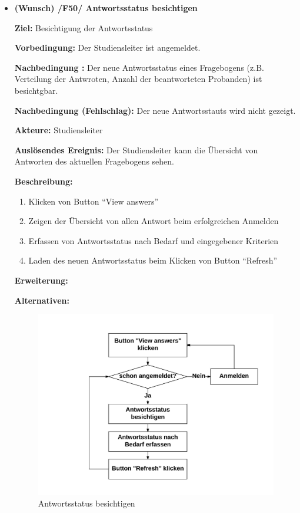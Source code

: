 \documentclass[a4paper]{scrreprt}
\begin{document}
\begin{itemize}
                \item \textbf{(Wunsch) /F50/ \gls{Antwortsstatus} besichtigen}
                \par \textbf{Ziel: }Besichtigung der Antwortsstatus
                \par \textbf{Vorbedingung: }Der \gls{Studiensleiter} ist angemeldet.
                \par \textbf{Nachbedingung : }Der neue Antwortsstatus eines Fragebogens (z.B. Verteilung der Antwroten, Anzahl der beantworteten \gls{Proband}en) ist besichtgbar.
                \par \textbf{Nachbedingung (Fehlschlag): }Der neue Antwortsstauts wird nicht gezeigt.
                \par \textbf{Akteure: }\gls{Studiensleiter}
                \par \textbf{Auslösendes Ereignis: }Der \gls{Studiensleiter} kann die \"Ubersicht von Antworten des aktuellen Fragebogens sehen.
                \par \textbf{Beschreibung: }
                \begin{enumerate}
                    \item Klicken von Button ``View answers''
                    \item Zeigen der \"Ubersicht von allen Antwort beim erfolgreichen Anmelden
                    \item Erfassen von Antwortsstatus nach Bedarf und eingegebener Kriterien
                    \item Laden des neuen Antwortsstatus beim Klicken von Button ``Refresh''
                \end{enumerate}
                \par \textbf{Erweiterung: }
                \par \textbf{Alternativen: }
                \begin{figure}[H]
                    \centering
                    \includegraphics[scale=0.8]{Antwortsstatus_besichtigen.jpeg}
                    \caption{Antwortsstatus besichtigen}
                \end{figure}



\end{itemize}
\end{document}
